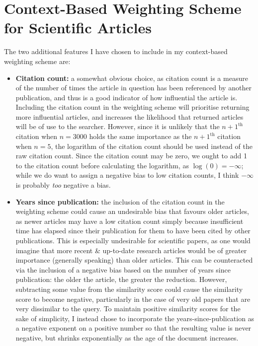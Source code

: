\documentclass[a4paper]{article}
\begin{document}
\section{Context-Based Weighting Scheme for Scientific Articles}
The two additional features I  have chosen to include in my context-based weighting scheme are:
\begin{itemize}
    \item   \textbf{Citation count:} a somewhat obvious choice, as citation count is a measure of the number of times the article in question has been referenced by another publication, and thus is a good indicator of how influential the article is.
            Including the citation count in the weighting scheme will prioritise returning more influential articles, and increases the likelihood that returned articles will be of use to the searcher.
            However, since it is unlikely that the $n+1^\text{th}$ citation when $n = 3000$ holds the same importance as the $n+1^\text{th}$ citation when $n = 5$, the logarithm of the citation count should be used instead of the raw citation count.
            Since the citation count may be zero, we ought to add 1 to the citation count before calculating the logarithm, as $\log(0) = - \infty$;
            while we do want to assign a negative bias to low citation counts, I think $-\infty$ is probably \textit{too} negative a bias.

    \item   \textbf{Years since publication:} the inclusion of the citation count in the weighting scheme could cause an undesirable bias that favours older articles, as newer articles may have a low citation count simply because insufficient time has elapsed since their publication for them to have been cited by other publications.
            This is especially undesirable for scientific papers, as one would imagine that more recent \& up-to-date research articles would be of greater importance (generally speaking) than older articles.
            This can be counteracted via the inclusion of a negative bias based on the number of years since publication: the older the article, the greater the reduction.
            However, subtracting some value from the similarity score could cause the similarity score to become negative, particularly in the case of very old papers that are very dissimilar to the query.
            To maintain positive similarity scores for the sake of simplicity, I instead chose to incorporate the years-since-publication as a negative exponent on a positive number so that the resulting value is never negative, but shrinks exponentially as the age of the document increases.
\end{itemize}
\end{document}
